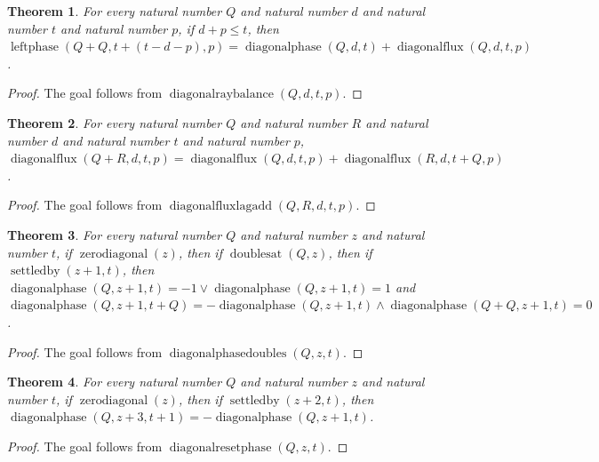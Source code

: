 \documentclass[11pt]{article}
\newtheorem{theorem}{Theorem}[section]
\theoremstyle{definition}
\begin{document}
\begin{theorem}
\label{ll:observations:diagonal-ray-balance}
For every natural number \(Q\) and natural number \(d\) and natural number \(t\) and natural number \(p\), if \(d + p \le t\), then \(\operatorname{leftphase}(Q + Q, t + (t - d - p), p) = \operatorname{diagonalphase}(Q, d, t) + \operatorname{diagonalflux}(Q, d, t, p)\).
\end{theorem}
\begin{proof}
The goal follows from \(\operatorname{diagonalraybalance}(Q, d, t, p)\).
\end{proof}
\begin{theorem}
\label{ll:observations:diagonal-flux-lag-add}
For every natural number \(Q\) and natural number \(R\) and natural number \(d\) and natural number \(t\) and natural number \(p\), \(\operatorname{diagonalflux}(Q + R, d, t, p) = \operatorname{diagonalflux}(Q, d, t, p) + \operatorname{diagonalflux}(R, d, t + Q, p)\).
\end{theorem}
\begin{proof}
The goal follows from \(\operatorname{diagonalfluxlagadd}(Q, R, d, t, p)\).
\end{proof}
\begin{theorem}
\label{ll:observations:diagonal-phase-doubles}
For every natural number \(Q\) and natural number \(z\) and natural number \(t\), if \(\operatorname{zerodiagonal}(z)\), then if \(\operatorname{doublesat}(Q, z)\), then if \(\operatorname{settledby}(z + 1, t)\), then \(\operatorname{diagonalphase}(Q, z + 1, t) = -1 \lor \operatorname{diagonalphase}(Q, z + 1, t) = 1\) and \(\operatorname{diagonalphase}(Q, z + 1, t + Q) = -\operatorname{diagonalphase}(Q, z + 1, t) \land \operatorname{diagonalphase}(Q + Q, z + 1, t) = 0\).
\end{theorem}
\begin{proof}
The goal follows from \(\operatorname{diagonalphasedoubles}(Q, z, t)\).
\end{proof}
\begin{theorem}
\label{ll:observations:diagonal-reset-phase}
For every natural number \(Q\) and natural number \(z\) and natural number \(t\), if \(\operatorname{zerodiagonal}(z)\), then if \(\operatorname{settledby}(z + 2, t)\), then \(\operatorname{diagonalphase}(Q, z + 3, t + 1) = -\operatorname{diagonalphase}(Q, z + 1, t)\).
\end{theorem}
\begin{proof}
The goal follows from \(\operatorname{diagonalresetphase}(Q, z, t)\).
\end{proof}
\end{document}
